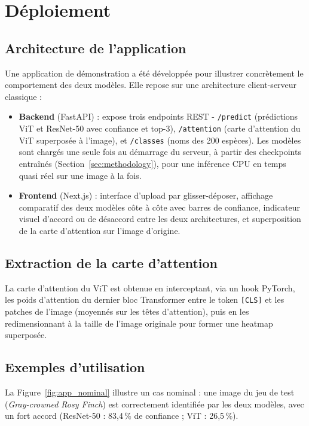 \section{Déploiement}
\label{sec:deployment}

\subsection{Architecture de l'application}

Une application de démonstration a été développée pour illustrer
concrètement le comportement des deux modèles. Elle repose sur une
architecture client-serveur classique :

\begin{itemize}
  \item \textbf{Backend} (FastAPI) : expose trois endpoints REST -
    \texttt{/predict} (prédictions ViT et ResNet-50 avec confiance et
    top-3), \texttt{/attention} (carte d'attention du ViT superposée à
    l'image), et \texttt{/classes} (noms des 200 espèces). Les modèles
    sont chargés une seule fois au démarrage du serveur, à partir des
    checkpoints entraînés (Section~\ref{sec:methodology}), pour une
    inférence CPU en temps quasi réel sur une image à la fois.
  \item \textbf{Frontend} (Next.js) : interface d'upload par
    glisser-déposer, affichage comparatif des deux modèles côte à côte
    avec barres de confiance, indicateur visuel d'accord ou de désaccord
    entre les deux architectures, et superposition de la carte
    d'attention sur l'image d'origine.
\end{itemize}

\subsection{Extraction de la carte d'attention}

La carte d'attention du ViT est obtenue en interceptant, via un hook
PyTorch, les poids d'attention du dernier bloc Transformer entre le
token \texttt{[CLS]} et les patches de l'image (moyennés sur les têtes
d'attention), puis en les redimensionnant à la taille de l'image
originale pour former une heatmap superposée.

\subsection{Exemples d'utilisation}

La Figure~\ref{fig:app_nominal} illustre un cas nominal : une image du
jeu de test (\emph{Gray-crowned Rosy Finch}) est correctement identifiée
par les deux modèles, avec un fort accord (ResNet-50 : 83{,}4\,\% de
confiance ; ViT : 26{,}5\,\%).

